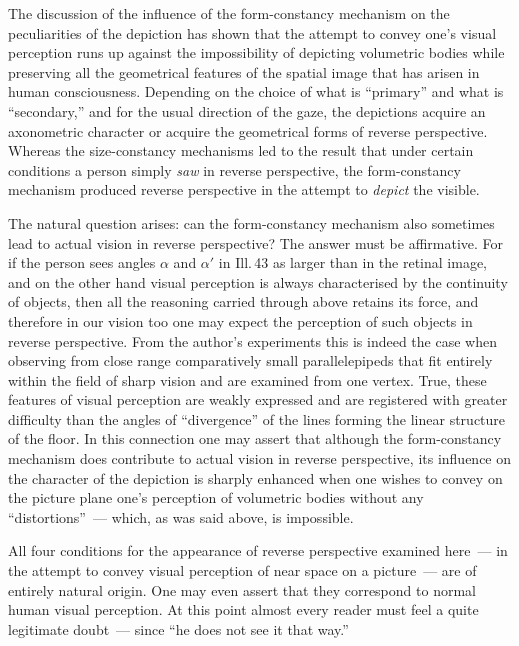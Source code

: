 

The discussion of the influence of the form-constancy mechanism on the peculiarities
of the depiction has shown that the attempt to convey one's visual perception runs up
against the impossibility of depicting volumetric bodies while preserving all the
geometrical features of the spatial image that has arisen in human consciousness.
Depending on the choice of what is ``primary'' and what is ``secondary,'' and for the
usual direction of the gaze, the depictions acquire an axonometric character or
acquire the geometrical forms of reverse perspective.  Whereas the size-constancy
mechanisms led to the result that under certain conditions a person simply \emph{saw}
in reverse perspective, the form-constancy mechanism produced reverse perspective in
the attempt to \emph{depict} the visible.

The natural question arises: can the form-constancy mechanism also sometimes lead to
actual vision in reverse perspective?  The answer must be affirmative.  For if the
person sees angles $\alpha$ and $\alpha'$ in Ill.\,43 as larger than in the retinal
image, and on the other hand visual perception is always characterised by the
continuity of objects, then all the reasoning carried through above retains its
force, and therefore in our vision too one may expect the perception of such objects
in reverse perspective.  From the author's experiments this is indeed the case when
observing from close range comparatively small parallelepipeds that fit entirely
within the field of sharp vision and are examined from one vertex.  True, these
features of visual perception are weakly expressed and are registered with greater
difficulty than the angles of ``divergence'' of the lines forming the linear
structure of the floor.  In this connection one may assert that although the
form-constancy mechanism does contribute to actual vision in reverse perspective, its
influence on the character of the depiction is sharply enhanced when one wishes to
convey on the picture plane one's perception of volumetric bodies without any
``distortions''~--- which, as was said above, is impossible.


All four conditions for the appearance of reverse perspective examined here~--- in
the attempt to convey visual perception of near space on a picture~--- are of
entirely natural origin.  One may even assert that they correspond to normal human
visual perception.  At this point almost every reader must feel a quite legitimate
doubt~--- since ``he does not see it that way.''

